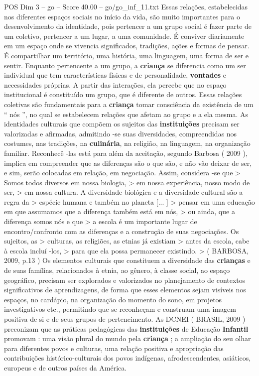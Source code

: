 \begin{textsample}{POS Dim 3 – go – Score 40.00 – go/go\_inf\_11.txt}
Essas relações, estabelecidas nos diferentes espaços sociais no início da vida, são muito importantes para o desenvolvimento da identidade, pois pertencer a um grupo social é fazer parte de um coletivo, pertencer a um lugar, a uma comunidade.
É conviver diariamente em um espaço onde se vivencia significados, tradições, ações e formas de pensar.
É compartilhar um território, uma história, uma linguagem, uma forma de ser e sentir.
Enquanto pertencente a um grupo, a \textbf{criança} se diferencia como um ser individual que tem características físicas e de personalidade, \textbf{vontades} e necessidades próprias.
A partir das interações, ela percebe que no espaço institucional é constituído um grupo, que é diferente de outros.
Essas relações coletivas são fundamentais para a \textbf{criança} tomar consciência da existência de um “ nós ”, no qual se estabelecem relações que afetam ao grupo e a ela mesma.
As identidades culturais que compõem os sujeitos das \textbf{instituições} precisam ser valorizadas e afirmadas, admitindo -se suas diversidades, compreendidas nos costumes, nas tradições, na \textbf{culinária}, na religião, na linguagem, na organização familiar.
Reconhecê -las está para além da aceitação, segundo Barbosa ( 2009 ), implica em compreender que as diferenças são o que são, e não vão deixar de ser, e sim, serão colocadas em relação, em negociação.
Assim, considera -se que > Somos todos diversos em nossa biologia, > em nossa experiência, nosso modo de ser, > em nossa cultura.
A diversidade biológica e a diversidade cultural são a regra da > espécie humana e também no planeta [... ] > pensar em uma educação em que assumamos que a diferença também está em nós, > ou ainda, que a diferença somos nós e que > a escola é um importante lugar de encontro/confronto com as diferenças e a construção de suas negociações.
Os sujeitos, as > culturas, as religiões, as etnias já existiam > antes da escola, cabe à escola incluí -los, > para que ela possa permanecer existindo. > ( BARBOSA, 2009, p.13 ) Os elementos culturais que constituem a diversidade das \textbf{crianças} e de suas famílias, relacionados à etnia, ao gênero, à classe social, ao espaço geográfico, precisam ser explorados e valorizados no planejamento de contextos significativos de aprendizagens, de forma que esses elementos sejam visíveis nos espaços, no cardápio, na organização do momento do sono, em projetos investigativos etc., permitindo que se reconheçam e construam uma imagem positiva de si e de seus grupos de pertencimento.
As DCNEI ( BRASIL, 2009 ) preconizam que as práticas pedagógicas das \textbf{instituições} de Educação \textbf{Infantil} promovam : uma visão plural do mundo pela \textbf{criança} ; a ampliação do seu olhar para diferentes povos e culturas, uma relação positiva e apropriação das contribuições histórico-culturais dos povos indígenas, afrodescendentes, asiáticos, europeus e de outros países da América.

\end{textsample}
